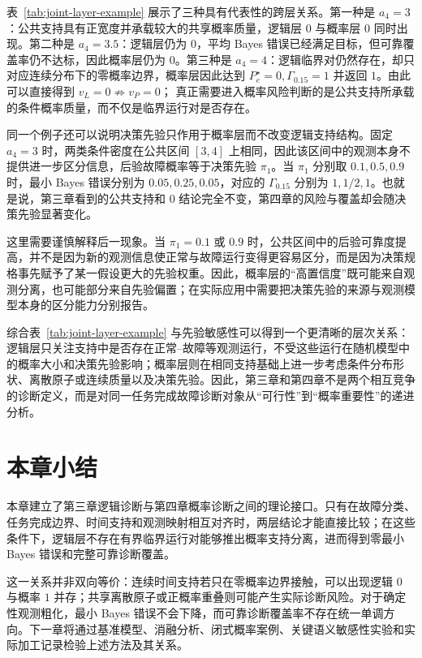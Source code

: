 \documentclass[master,fontset=ubuntu]{shnuthesis}
\DeclareRobustCommand{\logicstatus}[1]{\ensuremath{#1}}
\DeclareRobustCommand{\probstatus}[1]{\ensuremath{#1}}
\theoremstyle{definition}
\begin{document}
表~\ref{tab:joint-layer-example} 展示了三种具有代表性的跨层关系。第一种是 \(a_4=3\)：公共支持具有正宽度并承载较大的共享概率质量，逻辑层 \logicstatus{0} 与概率层 \probstatus{0} 同时出现。第二种是 \(a_4=3.5\)：逻辑层仍为 \logicstatus{0}，平均 Bayes 错误已经满足目标，但可靠覆盖率仍不达标，因此概率层仍为 \probstatus{0}。第三种是 \(a_4=4\)：逻辑临界对仍然存在，却只对应连续分布下的零概率边界，概率层因此达到 \(P_e^\star=0,\Gamma_{0.15}=1\) 并返回 \probstatus{1}。由此可以直接得到
\(v_L=0\not\Rightarrow v_P=0\)；
真正需要进入概率风险判断的是公共支持所承载的条件概率质量，而不仅是临界运行对是否存在。

同一个例子还可以说明决策先验只作用于概率层而不改变逻辑支持结构。固定 \(a_4=3\) 时，两类条件密度在公共区间 \([3,4]\) 上相同，因此该区间中的观测本身不提供进一步区分信息，后验故障概率等于决策先验 \(\pi_1\)。当 \(\pi_1\) 分别取 \(0.1,0.5,0.9\) 时，最小 Bayes 错误分别为 \(0.05,0.25,0.05\)，对应的 \(\Gamma_{0.15}\) 分别为 \(1,1/2,1\)。也就是说，第三章看到的公共支持和 \logicstatus{0} 结论完全不变，第四章的风险与覆盖却会随决策先验显著变化。

这里需要谨慎解释后一现象。当 \(\pi_1=0.1\) 或 \(0.9\) 时，公共区间中的后验可靠度提高，并不是因为新的观测信息使正常与故障运行变得更容易区分，而是因为决策规格事先赋予了某一假设更大的先验权重。因此，概率层的“高置信度”既可能来自观测分离，也可能部分来自先验偏置；在实际应用中需要把决策先验的来源与观测模型本身的区分能力分别报告。

综合表~\ref{tab:joint-layer-example} 与先验敏感性可以得到一个更清晰的层次关系：逻辑层只关注支持中是否存在正常--故障等观测运行，不受这些运行在随机模型中的概率大小和决策先验影响；概率层则在相同支持基础上进一步考虑条件分布形状、离散原子或连续质量以及决策先验。因此，第三章和第四章不是两个相互竞争的诊断定义，而是对同一任务完成故障诊断对象从“可行性”到“概率重要性”的递进分析。

\section{本章小结}

本章建立了第三章逻辑诊断与第四章概率诊断之间的理论接口。只有在故障分类、任务完成边界、时间支持和观测映射相互对齐时，两层结论才能直接比较；在这些条件下，逻辑层不存在有界临界运行对能够推出概率支持分离，进而得到零最小 Bayes 错误和完整可靠诊断覆盖。

这一关系并非双向等价：连续时间支持若只在零概率边界接触，可以出现逻辑 \logicstatus{0} 与概率 \probstatus{1} 并存；共享离散原子或正概率重叠则可能产生实际诊断风险。对于确定性观测粗化，最小 Bayes 错误不会下降，而可靠诊断覆盖率不存在统一单调方向。下一章将通过基准模型、消融分析、闭式概率案例、关键语义敏感性实验和实际加工记录检验上述方法及其关系。
\end{document}
